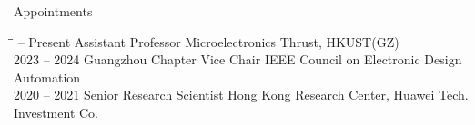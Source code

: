 
\iffalse
\begin{rSection}{Experience}
{\bf Assistant Professor}         \hfill { Nov.~2021 -- Present} \\
The Hong Kong University of Science and Technology (Guangzhou) \\
Guangzhou, China

{\bf Senior Research Scientist}         \hfill { Sep.~2020 -- Nov.~2021} \\
Huawei Hong Kong Research Center\\
Hong Kong SAR, China

{\bf Research Intern}         \hfill { June 2019 -- Feb.~2020} \\
YouTu Lab, Tencent\\
Shenzhen, China

{\bf Research Intern}               \hfill { Jul.~2018 -- Nov.~2018} \\
ASIC and VLSI Research Group, NVIDIA Research\\
Austin, TX, USA

{\bf Research Intern}               \hfill { May 2017 -- Sep.~2017} \\
Innovus Team, Cadence Design Systems Inc.\\
San Jose, CA, USA

\end{rSection}
\fi

\begin{rSection}{Appointments}
	\begin{tabbing}
		\hspace{1in}\=\hspace{2.2in}\= -- Present                 \>Assistant Professor       \> Microelectronics Thrust, HKUST(GZ)  \\
		
		2023 -- 2024					\>Guangzhou Chapter Vice Chair \> IEEE Council on Electronic Design Automation \\
		
		2020 -- 2021                    \>Senior Research Scientist \> Hong Kong Research Center, Huawei Tech. Investment Co.
	\end{tabbing}
\end{rSection}

